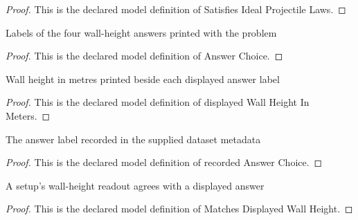 \begin{proof}
  This is the declared model definition of Satisfies Ideal Projectile Laws.
\end{proof}
\begin{definition}
  \label{def:physics:phyx-mini-0747:phyxminiproblems-problemphyxmini0747-answerchoice}
  Labels of the four wall-height answers printed with the problem
\end{definition}
\begin{proof}
  This is the declared model definition of Answer Choice.
\end{proof}
\begin{definition}
  \label{def:physics:phyx-mini-0747:phyxminiproblems-problemphyxmini0747-displayedwallheightinmeters}
  Wall height in metres printed beside each displayed answer label
\end{definition}
\begin{proof}
  This is the declared model definition of displayed Wall Height In Meters.
\end{proof}
\begin{definition}
  \label{def:physics:phyx-mini-0747:phyxminiproblems-problemphyxmini0747-recordedanswerchoice}
  The answer label recorded in the supplied dataset metadata
\end{definition}
\begin{proof}
  This is the declared model definition of recorded Answer Choice.
\end{proof}
\begin{definition}
  \label{def:physics:phyx-mini-0747:phyxminiproblems-problemphyxmini0747-matchesdisplayedwallheight}
  A setup's wall-height readout agrees with a displayed answer
\end{definition}
\begin{proof}
  This is the declared model definition of Matches Displayed Wall Height.
\end{proof}
